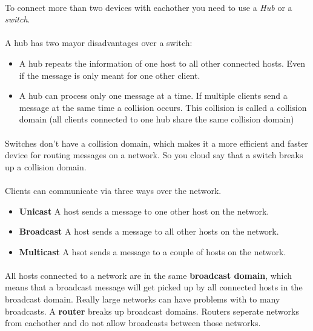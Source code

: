 \documentclass[10pt,landscape]{article}
\begin{document}
\begin{multicols}{3}
\paragraph{}
 To connect more than two devices with eachother you need to use a \textit{Hub} or a \textit{switch}.
\paragraph{}
A hub has two mayor disadvantages over a switch:
\begin{itemize}
	\item A hub repeats the information of one host to all other connected hosts. Even if the message is only meant for one
	other client.
	\item A hub can process only one message at a time. If multiple clients send a message at the same time a collision occurs.
	This collision is called a collision domain (all clients connected to one hub share the same collision domain)
\end{itemize}
\paragraph{}
Switches don't have a collision domain, which makes it a more efficient and faster device for routing messages on a network.
So you cloud say that a switch breaks up a collision domain.
\paragraph{}
Clients can communicate via three ways over the network.
\begin{itemize}
	\item \textbf{Unicast} A host sends a message to one other host on the network.
	\item \textbf{Broadcast} A host sends a message to all other hosts on the network.
	\item \textbf{Multicast} A hsot sends a message to a couple of hosts on the network.
\end{itemize}
\paragraph{}
All hosts connected to a network are in the same \textbf{broadcast domain}, which means that a broadcast message will get picked
up by all connected hosts in the broadcast domain. Really large networks can have problems with to many broadcasts. A \textbf{router}
breaks up broadcast domains. Routers seperate networks from eachother and do not allow broadcasts between those networks.

\end{multicols}
\end{document}
